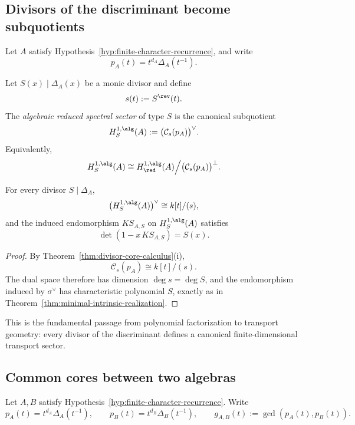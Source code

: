 \subsection{Divisors of the discriminant become subquotients}

Let \(A\) satisfy Hypothesis~\ref{hyp:finite-character-recurrence}, and write
\[
p_A(t)=t^{d_A}\Delta_A(t^{-1}).
\]

\begin{definition}
Let \(S(x)\mid \Delta_A(x)\) be a monic divisor and define
\[
s(t):=S^{\rev}(t).
\]
The \emph{algebraic reduced spectral sector} of type \(S\) is the canonical subquotient
\[
H^{1,\alg}_S(A):=\bigl(\mathcal C_s(p_A)\bigr)^\vee.
\]
Equivalently,
\[
H^{1,\alg}_S(A)\cong H^{1,\alg}_{\red}(A)\Big/\bigl(\mathcal C_s(p_A)\bigr)^\perp.
\]
\end{definition}

\begin{theorem}
\ClaimStatusProvedHere
\label{thm:sector-determinant}
For every divisor \(S\mid \Delta_A\),
\[
\bigl(H^{1,\alg}_S(A)\bigr)^\vee\cong k[t]/(s),
\]
and the induced endomorphism \(KS_{A,S}\) on \(H^{1,\alg}_S(A)\) satisfies
\[
\det(1-x\,KS_{A,S})=S(x).
\]
\end{theorem}

\begin{proof}
By Theorem~\ref{thm:divisor-core-calculus}\textup{(i)},
\[
\mathcal C_s(p_A)\cong k[t]/(s).
\]
The dual space therefore has dimension \(\deg s=\deg S\), and the endomorphism induced by \(\sigma^\vee\) has characteristic polynomial \(S\), exactly as in Theorem~\ref{thm:minimal-intrinsic-realization}.
\end{proof}

\begin{remark}
This is the fundamental passage from polynomial factorization to transport geometry:
every divisor of the discriminant defines a canonical finite-dimensional transport sector.
\end{remark}

\subsection{Common cores between two algebras}

Let \(A,B\) satisfy Hypothesis~\ref{hyp:finite-character-recurrence}.
Write
\[
p_A(t)=t^{d_A}\Delta_A(t^{-1}),
\qquad
p_B(t)=t^{d_B}\Delta_B(t^{-1}),
\qquad
g_{A,B}(t):=\gcd(p_A(t),p_B(t)).
\]

